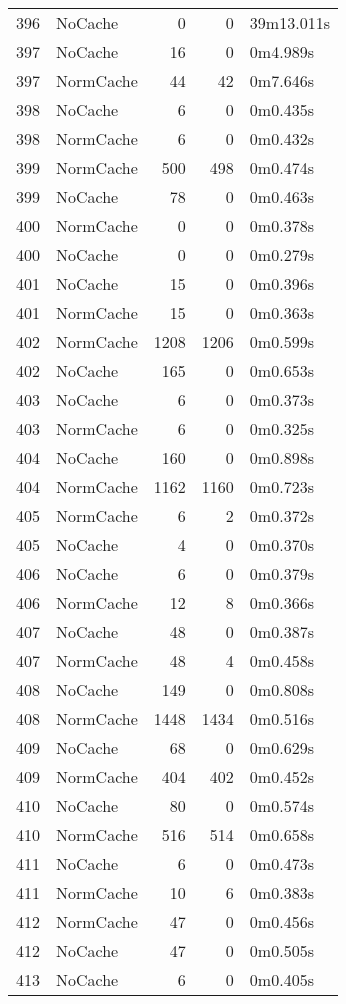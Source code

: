 \begin{tabular}{llrrl}
396 & NoCache & 0 & 0 & 39m13.011s \\
397 & NoCache & 16 & 0 & 0m4.989s \\
397 & NormCache & 44 & 42 & 0m7.646s \\
398 & NoCache & 6 & 0 & 0m0.435s \\
398 & NormCache & 6 & 0 & 0m0.432s \\
399 & NormCache & 500 & 498 & 0m0.474s \\
399 & NoCache & 78 & 0 & 0m0.463s \\
400 & NormCache & 0 & 0 & 0m0.378s \\
400 & NoCache & 0 & 0 & 0m0.279s \\
401 & NoCache & 15 & 0 & 0m0.396s \\
401 & NormCache & 15 & 0 & 0m0.363s \\
402 & NormCache & 1208 & 1206 & 0m0.599s \\
402 & NoCache & 165 & 0 & 0m0.653s \\
403 & NoCache & 6 & 0 & 0m0.373s \\
403 & NormCache & 6 & 0 & 0m0.325s \\
404 & NoCache & 160 & 0 & 0m0.898s \\
404 & NormCache & 1162 & 1160 & 0m0.723s \\
405 & NormCache & 6 & 2 & 0m0.372s \\
405 & NoCache & 4 & 0 & 0m0.370s \\
406 & NoCache & 6 & 0 & 0m0.379s \\
406 & NormCache & 12 & 8 & 0m0.366s \\
407 & NoCache & 48 & 0 & 0m0.387s \\
407 & NormCache & 48 & 4 & 0m0.458s \\
408 & NoCache & 149 & 0 & 0m0.808s \\
408 & NormCache & 1448 & 1434 & 0m0.516s \\
409 & NoCache & 68 & 0 & 0m0.629s \\
409 & NormCache & 404 & 402 & 0m0.452s \\
410 & NoCache & 80 & 0 & 0m0.574s \\
410 & NormCache & 516 & 514 & 0m0.658s \\
411 & NoCache & 6 & 0 & 0m0.473s \\
411 & NormCache & 10 & 6 & 0m0.383s \\
412 & NormCache & 47 & 0 & 0m0.456s \\
412 & NoCache & 47 & 0 & 0m0.505s \\
413 & NoCache & 6 & 0 & 0m0.405s \\

\end{tabular}
